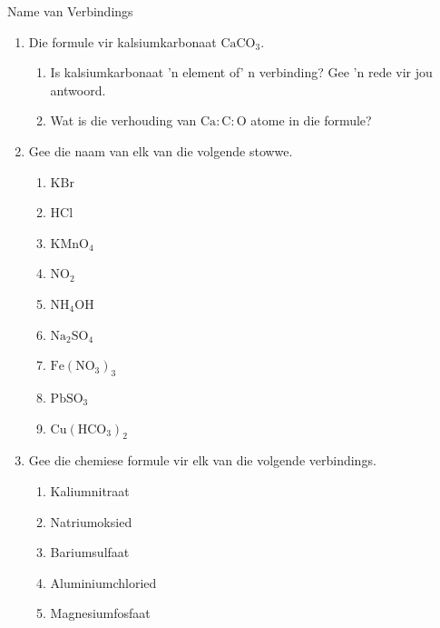   \label{m38708*secfhsst!!!underscore!!!id255}
            \begin{exercises}{Name van Verbindings}
{            \nopagebreak \noindent
      \label{m38708*id65118}\begin{enumerate}[noitemsep, label=\textbf{\arabic*}. ] 
            \label{m38708*uid47}\item Die formule vir kalsiumkarbonaat $\text{CaCO}{}_{3}$.
\label{m38708*id65148}\begin{enumerate}[noitemsep, label=\textbf{\alph*}. ] 
            \label{m38708*uid48}\item Is kalsiumkarbonaat 'n element of' n verbinding? Gee 'n rede vir jou antwoord.
\label{m38708*uid49}\item Wat is die verhouding van $\text{Ca}:\text{C}:\text{O}$ atome in die formule?
\end{enumerate}
\label{m38708*uid50}\item Gee die naam van elk van die volgende stowwe.
\label{m38708*id65189}\begin{enumerate}[noitemsep, label=\textbf{\alph*}. ] 
            \label{m38708*uid51}\item $\text{KBr}$
\label{m38708*uid52}\item $\text{HCl}$
\label{m38708*uid53}\item ${\text{KMnO}}_{4}$\label{m38708*uid54}\item ${\text{NO}}_{2}$\label{m38708*uid55}\item ${\text{NH}}_{4}\text{OH}$
\label{m38708*uid56}\item ${\text{Na}}_{2}{\text{SO}}_{4}$
\item ${\text{Fe}}({\text{NO}}_{3})_3$
\item ${\text{Pb}}{\text{SO}}_{3}$
\item ${\text{Cu}}({\text{HCO}}_{3})_2$
\end{enumerate}
\label{m38708*uid57}\item Gee die chemiese formule vir elk van die volgende verbindings.
\label{m38708*id65338}\begin{enumerate}[noitemsep, label=\textbf{\alph*}. ] 
            \label{m38708*uid58}\item Kaliumnitraat
\label{m38708*uid59}\item Natriumoksied
\label{m38708*uid60}\item Bariumsulfaat
\label{m38708*uid61}\item Aluminiumchloried
\label{m38708*uid62}\item Magnesiumfosfaat

\end{enumerate}
\end{enumerate}}
\end{exercises}
